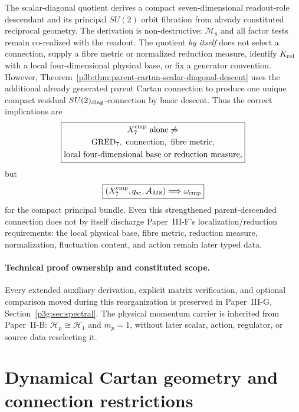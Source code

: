 \documentclass[12pt,a4paper]{article}
\begin{document}
\begin{remark}
\label{p3b:rem:compact-seven-not-gred}
The scalar-diagonal quotient derives a compact seven-dimensional readout-role
descendant and its principal \(SU(2)\) orbit fibration from already
constituted reciprocal geometry.  The derivation is non-destructive:
\(\mathcal M_8\) and all factor tests remain co-realized with the readout.
The quotient \emph{by itself} does not select a connection, supply a fibre
metric or normalized reduction measure, identify \(K_{\rm rel}\) with a local
four-dimensional physical base, or fix a generator convention.  However,
Theorem~\ref{p3b:thm:parent-cartan-scalar-diagonal-descent} uses the additional
already generated parent Cartan connection to produce one unique compact
residual \(SU(2)_{\rm diag}\)-connection by basic descent.  Thus the correct
implications are
\[
 \boxed{\begin{gathered}
 X_7^{\rm cmp}\ \text{alone}\not\Rightarrow\\
 \mathrm{GRED}_7,\ \text{connection},\ \text{fibre metric},\\
 \text{local four-dimensional base or reduction measure},
 \end{gathered}}
\]
but
\[
 \boxed{
 (X_7^{\rm cmp},q_{\rm sc},\mathcal A_{M8})
 \Longrightarrow \omega_{\rm cmp}
 }
\]
for the compact principal bundle.  Even this strengthened parent-descended
connection does not by itself discharge Paper~III-F's localization/reduction
requirements: the local physical base, fibre metric, reduction measure,
normalization, fluctuation content, and action remain later typed data.
\end{remark}


\paragraph{Technical proof ownership and constituted scope.}
Every extended auxiliary derivation, explicit matrix verification,
and optional comparison moved during this reorganization is
preserved in Paper~III-G, Section~\ref{p3g:sec:spectral}.
The physical momentum carrier is inherited from Paper~II-B:
$\mathcal H_p\cong\mathcal H_1$ and $m_p=1$, without later
scalar, action, regulator, or source data reselecting it.

\section{Dynamical Cartan geometry and connection restrictions}
\label{paper3b:sec:organized-cartan}
\end{document}
